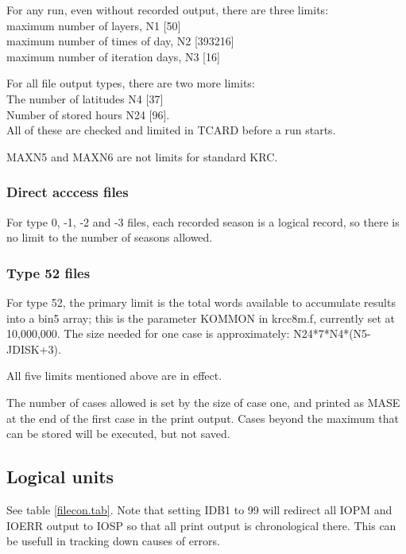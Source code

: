 \documentclass{article}
\newcommand{\qi}{\\ \hspace*{2.em}}      %
\begin{document}
For any run, even without recorded output, there are three limits:
\qi maximum number of layers, N1 [50]  
\qi maximum number of times of day, N2 [393216]
\qi maximum number of iteration days, N3 [16]

For all file output types, there are two more limits:
\qi The number of latitudes N4 [37] 
\qi  Number of stored hours N24 [96]. 
\\ All of these are checked and limited in TCARD before a run starts.

MAXN5 and MAXN6 are not limits for standard KRC.

\subsubsection{Direct acccess files} %
For type 0, -1, -2 and -3 files, each recorded season is a logical record, so
there is no limit to the number of seasons allowed.

\subsubsection{Type 52 files} %

For type 52, the primary limit is the total words available to accumulate
results into a bin5 array; this is the parameter KOMMON in krcc8m.f, currently
set at 10,000,000. The size needed for one case is approximately:  
N24*7*N4*(N5-JDISK+3).

All five limits mentioned above are in effect.

The number of cases allowed is set by the size of case one, and printed as MASE
at the end of the first case in the print output. Cases beyond the maximum that
can be stored will be executed, but not saved.

\subsection{Logical units} %
See table \ref{filecon.tab}. Note that setting IDB1 to 99 will redirect all IOPM
and IOERR output to IOSP so that all print output is chronological there. This
can be usefull in tracking down causes of errors.
\end{document}

